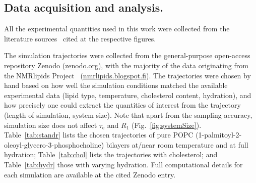 \documentclass[journal=jcisd8,manuscript=article,layout=twocolumn]{achemso}
\begin{document}

\subsection*{Data acquisition and analysis.}
%
All the experimental quantities used in this work were collected from the literature sources~\cite{ferreira15,pham15,Volke:1995a,Antila:2020a} cited at the respective figures.   

%
The simulation trajectories were collected from the general-purpose open-access repository Zenodo (\url{zenodo.org}), with the majority of the data originating from the NMR\-lipids Project~\cite{botan15,catte16} (\url{nmrlipids.blogspot.fi}). The trajectories were chosen by hand based on how well the simulation conditions matched the available experimental data (lipid type, temperature, cholesterol content, hydration), and how precisely one could extract the quantities of interest from the trajectory (length of simulation, system size).
%
Note that apart from the sampling accuracy, simulation size does not affect $\tau_\mathrm e$ and $R_1$ (Fig.~\ref{fig:systemSize}).
Table~\ref{tab:standr} lists the chosen trajectories of pure POPC (1-palmit\-oyl-2-oleoyl-glycero-3-phosphocholine) bilayers at/near room temperature and at full hydration;
Table~\ref{tab:chol} lists the trajectories with cholesterol; and
Table~\ref{tab:hydr} those with varying hydration.
Full computational details for each simulation are available at the cited Zenodo entry.
\end{document}
